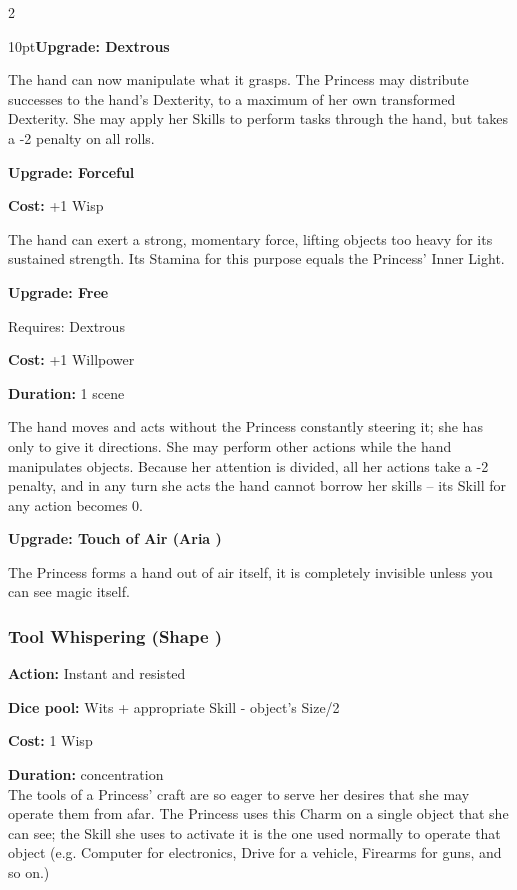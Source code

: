 \begin{multicols}{2}
\begin{myindentpar}{10pt}\textbf{Upgrade: Dextrous}

The hand can now manipulate what it grasps. The Princess may distribute successes to the hand's Dexterity, to a maximum of her own transformed Dexterity. She may apply her Skills to perform tasks through the hand, but takes a -2 penalty on all rolls.

\textbf{Upgrade: Forceful}

\noindent \textbf{Cost:} +1 Wisp

The hand can exert a strong, momentary force, lifting objects too heavy for its sustained strength. Its Stamina for this purpose equals the Princess' Inner Light.

\textbf{Upgrade: Free}

\noindent Requires: Dextrous

\noindent \textbf{Cost:} +1 Willpower

\noindent \textbf{Duration:} 1 scene

The hand moves and acts without the Princess constantly steering it; she has only to give it directions. She may perform other actions while the hand manipulates objects. Because her attention is divided, all her actions take a -2 penalty, and in any turn she acts the hand cannot borrow her skills -- its Skill for any action becomes 0.

\textbf{Upgrade: Touch of Air (Aria \textbullet\textbullet)}

The Princess forms a hand out of air itself, it is completely invisible unless you can see magic itself.\end{myindentpar}

\subsubsection*{Tool Whispering (Shape \textbullet\textbullet)}
\noindent \textbf{Action:} Instant and resisted

\noindent \textbf{Dice pool:} Wits + appropriate Skill - object’s Size/2

\noindent \textbf{Cost:} 1 Wisp

\noindent \textbf{Duration:} concentration \\

\noindent The tools of a Princess’ craft are so eager to serve her desires that she may operate them from afar. The Princess uses this Charm on a single object that she can see; the Skill she uses to activate it is the one used normally to operate that object (e.g. Computer for electronics, Drive for a vehicle, Firearms for guns, and so on.)


\end{multicols}
